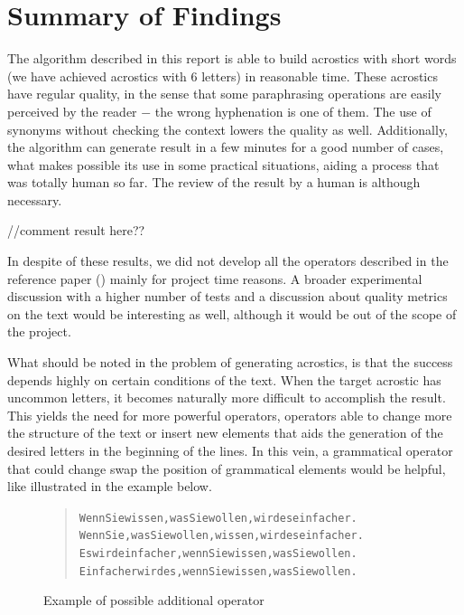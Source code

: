 \documentclass[11pt]{reportAlternative}
\begin{document}
\chapter{Summary of Findings}
The algorithm described in this report is able to build acrostics with short words (we have achieved acrostics with 6 letters) in reasonable time. These acrostics have regular quality, in the sense that some paraphrasing operations are easily perceived by the reader $-$ the wrong hyphenation is one of them. The use of synonyms without checking the context lowers the quality as well. Additionally, the algorithm can generate result in a few minutes for a good number of cases, what makes possible its use in some practical situations, aiding a process that was totally human so far. The review of the result by a human is although necessary. \par

//comment result here??\par

In despite of these results, we did not develop all the operators described in the reference paper (\cite{Stein}) mainly for project time reasons. A broader experimental discussion with a higher number of tests and a discussion about quality metrics on the text would be interesting as well, although it would be out of the scope of the project. \par

What should be noted in the problem of generating acrostics, is that the success depends highly on certain conditions of the text. When the target acrostic has uncommon letters, it becomes naturally more difficult to accomplish the result. This yields the need for more powerful operators, operators able to change more the structure of the text or insert new elements that aids the generation of the desired letters in the beginning of the lines. In this vein, a grammatical operator that could change swap the position of grammatical elements would be helpful, like illustrated in the example below. \par

\begin{figure}[H]
\begin{quote}
\begin{alltt}
Wenn Sie wissen, was Sie wollen, wird es einfacher.
Wenn Sie, was Sie wollen, wissen, wird es einfacher.
Es wird einfacher, wenn Sie wissen, was Sie wollen.
Einfacher wird es, wenn Sie wissen, was Sie wollen.
\end{alltt}
\end{quote}
\caption{Example of possible additional operator}
\end{figure}
\end{document}
